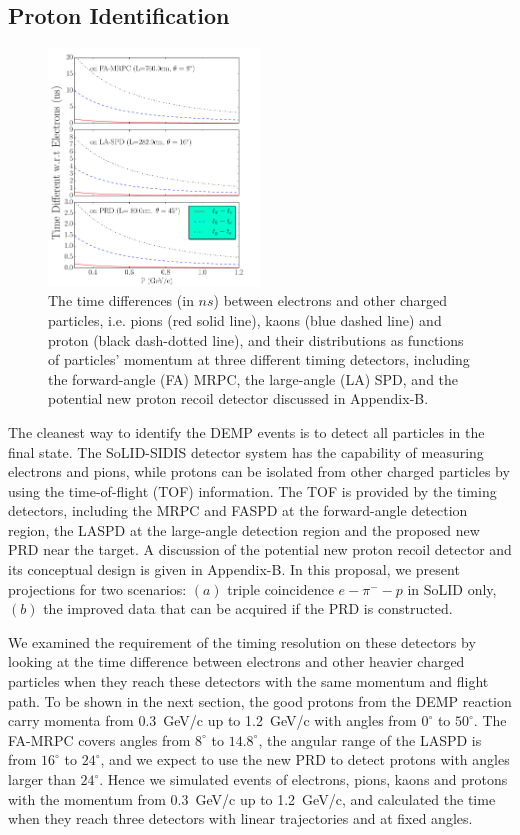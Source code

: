 \subsection{Proton Identification}
\begin{figure}[!ht]
 \begin{center}
  \includegraphics[width=0.5\textwidth]{./figures/time_diff.pdf}
   \caption[Time-of-time]{\footnotesize{The time differences (in $ns$) between
       electrons and other charged particles, i.e. pions (red solid line),
       kaons (blue dashed line) and proton (black dash-dotted line), and their
       distributions as functions of particles' momentum at three different
       timing detectors, including the forward-angle (FA) MRPC, the large-angle
       (LA) SPD, and the potential new proton recoil detector discussed in
       Appendix-B.}}
   \label{tof_diff}
 \end{center}
\end{figure}
The cleanest way to identify the DEMP events is to detect all particles in the
final state. The SoLID-SIDIS detector system has the capability of measuring
electrons and pions, while protons can be isolated from other charged particles
by using the time-of-flight (TOF) information. The TOF is provided by the timing
detectors, including the MRPC and FASPD at the forward-angle detection region,
the LASPD at the large-angle detection region and the proposed new PRD near the
target. A discussion of the potential new proton recoil detector and its
conceptual design is given in Appendix-B.  In this proposal, we present
projections for two scenarios: $(a)$ triple coincidence $e-\pi^--p$ in SoLID
only, $(b)$ the improved data that can be acquired if the PRD is constructed.

We examined the requirement of the timing resolution on these detectors by
looking at the time difference between electrons and other heavier charged
particles when they reach these detectors with the same momentum and flight
path. To be shown in the next section, the good protons from the DEMP reaction
carry momenta from 0.3~GeV/c up to 1.2~GeV/c with angles from
$0^{\circ}$ to $50^{\circ}$. The FA-MRPC covers angles from
$8^{\circ}$ to $14.8^{\circ}$, the angular range of the LASPD is from
$16^{\circ}$ to $24^{\circ}$, and we expect to use the new PRD to detect
protons with angles larger than $24^{\circ}$.  Hence we simulated
events of electrons, pions, kaons and protons with the momentum from
0.3~GeV/c up to 1.2~GeV/c, and calculated the time when they reach three
detectors with linear trajectories and at fixed angles.

